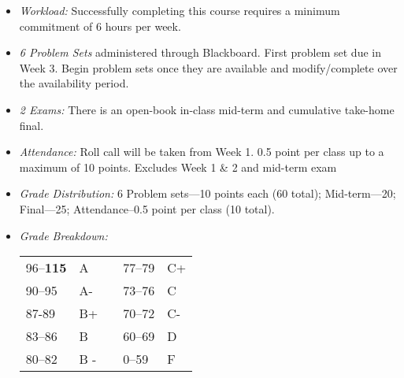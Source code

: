 \documentclass[11pt,article,oneside]{memoir}
\begin{document}
\begin{itemize}
\item \textit{Workload:} Successfully completing this course requires a minimum commitment of 6 hours per week. 

\item \textit{6 Problem Sets} administered through Blackboard. First problem set due in Week 3. Begin problem sets once they are available and modify/complete over the availability period. 

\item \textit{2 Exams:} There is an open-book in-class mid-term and cumulative take-home final.  

\item \textit{Attendance:} Roll call will be taken from Week 1. 0.5 point per class up to a maximum of 10 points. Excludes Week 1 \& 2 and mid-term exam
 

\item \textit{Grade Distribution:} 6 Problem sets---10 points each (60 total); Mid-term---20; Final---25; Attendance--0.5 point per class (10 total).

\item \textit{Grade Breakdown:}

 \begin{tabular}{ | l | l | p{2cm} | l | l | }
    \hline 
96--\textbf{115} & A  & &  77--79 &  C+ \\  
90--95 & A- & &  73--76 & C \\
87-89 & B+ &  &  70--72 & C- \\ 
83--86 & B  & &  60--69 & D\\
80--82 & B - & & 0--59 & F\\ \hline
    \end{tabular}


\end{itemize}
\end{document}
